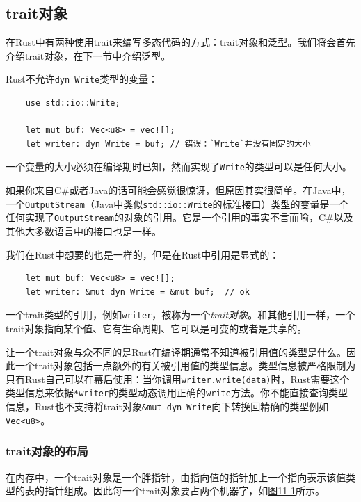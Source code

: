 \subsection{trait对象}\label{traitobject}
在Rust中有两种使用trait来编写多态代码的方式：trait对象和泛型。我们将会首先介绍trait对象，在下一节中介绍泛型。

Rust不允许\texttt{dyn Write}类型的变量：
\begin{verbatim}
    use std::io::Write;

    let mut buf: Vec<u8> = vec![];
    let writer: dyn Write = buf; // 错误：`Write`并没有固定的大小
\end{verbatim}

一个变量的大小必须在编译期时已知，然而实现了\texttt{Write}的类型可以是任何大小。

如果你来自C\#或者Java的话可能会感觉很惊讶，但原因其实很简单。在Java中，一个\texttt{OutputStream}（Java中类似\texttt{std::io::Write}的标准接口）类型的变量是一个任何实现了\texttt{OutputStream}的对象的引用。它是一个引用的事实不言而喻，C\#以及其他大多数语言中的接口也是一样。

我们在Rust中想要的也是一样的，但是在Rust中引用是显式的：
\begin{verbatim}
    let mut buf: Vec<u8> = vec![];
    let writer: &mut dyn Write = &mut buf;  // ok
\end{verbatim}

一个trait类型的引用，例如\texttt{writer}，被称为一个\emph{trait对象}。和其他引用一样，一个trait对象指向某个值、它有生命周期、它可以是可变的或者是共享的。

让一个trait对象与众不同的是Rust在编译期通常不知道被引用值的类型是什么。因此一个trait对象包括一点额外的有关被引用值的类型信息。类型信息被严格限制为只有Rust自己可以在幕后使用：当你调用\texttt{writer.write(data)}时，Rust需要这个类型信息来依据\texttt{*writer}的类型动态调用正确的\texttt{write}方法。你不能直接查询类型信息，Rust也不支持将trait对象\texttt{\&mut dyn Write}向下转换回精确的类型例如\texttt{Vec<u8>}。

\subsubsection{trait对象的布局}
在内存中，一个trait对象是一个胖指针，由指向值的指针加上一个指向表示该值类型的表的指针组成。因此每一个trait对象要占两个机器字，如\hyperref[f11-1]{图11-1}所示。

